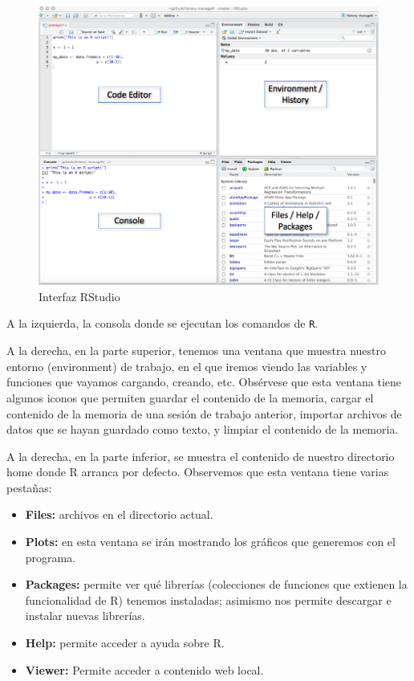 \documentclass[]{book}
\providecommand{\tightlist}{%
  \setlength{\itemsep}{0pt}\setlength{\parskip}{0pt}}
\begin{document}
\begin{figure}

{\centering \includegraphics[width=1\linewidth]{figures/rstudio_ide} 

}

\caption{Interfaz RStudio}\label{fig:pressure}
\end{figure}

A la izquierda, la consola donde se ejecutan los comandos de \texttt{R}.

A la derecha, en la parte superior, tenemos una ventana que muestra
nuestro entorno (environment) de trabajo, en el que iremos viendo las
variables y funciones que vayamos cargando, creando, etc. Obsérvese que
esta ventana tiene algunos iconos que permiten guardar el contenido de
la memoria, cargar el contenido de la memoria de una sesión de trabajo
anterior, importar archivos de datos que se hayan guardado como texto, y
limpiar el contenido de la memoria.

A la derecha, en la parte inferior, se muestra el contenido de nuestro
directorio home donde R arranca por defecto. Observemos que esta ventana
tiene varias pestañas:

\begin{itemize}
\tightlist
\item
  \textbf{Files:} archivos en el directorio actual.
\item
  \textbf{Plots:} en esta ventana se irán mostrando los gráficos que
  generemos con el programa.
\item
  \textbf{Packages:} permite ver qué librerías (colecciones de funciones
  que extienen la funcionalidad de R) tenemos instaladas; asimismo nos
  permite descargar e instalar nuevas librerías.
\item
  \textbf{Help:} permite acceder a ayuda sobre R.
\item
  \textbf{Viewer:} Permite acceder a contenido web local.
\end{itemize}
\end{document}
